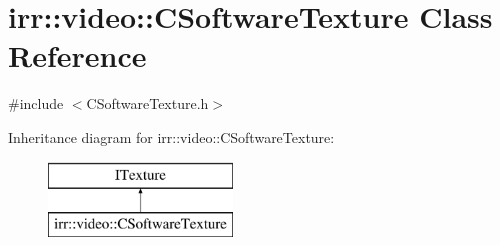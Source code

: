 \hypertarget{classirr_1_1video_1_1_c_software_texture}{\section{irr\-:\-:video\-:\-:C\-Software\-Texture Class Reference}
\label{classirr_1_1video_1_1_c_software_texture}
}


{\ttfamily \#include $<$C\-Software\-Texture.\-h$>$}

Inheritance diagram for irr\-:\-:video\-:\-:C\-Software\-Texture\-:\begin{figure}[H]
\begin{center}
\leavevmode
\includegraphics[height=2.000000cm]{classirr_1_1video_1_1_c_software_texture}
\end{center}
\end{figure}
